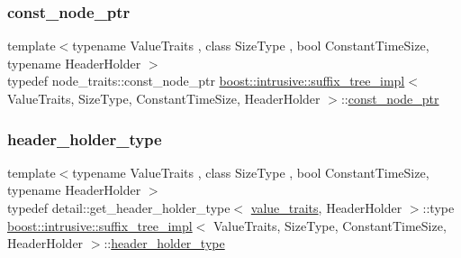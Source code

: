\subsubsection{\texorpdfstring{const\+\_\+node\+\_\+ptr}{const\_node\_ptr}}
{\footnotesize\ttfamily template$<$typename Value\+Traits , class Size\+Type , bool Constant\+Time\+Size, typename Header\+Holder $>$ \\
typedef node\+\_\+traits\+::const\+\_\+node\+\_\+ptr \hyperlink{classboost_1_1intrusive_1_1suffix__tree__impl}{boost\+::intrusive\+::suffix\+\_\+tree\+\_\+impl}$<$ Value\+Traits, Size\+Type, Constant\+Time\+Size, Header\+Holder $>$\+::\hyperlink{classboost_1_1intrusive_1_1suffix__tree__impl_a5cf354495727a0b22948de4115d0a2b8}{const\+\_\+node\+\_\+ptr}}

\mbox{\label{classboost_1_1intrusive_1_1suffix__tree__impl_acb00482132fdd79dc983b313f596e364}} 
\subsubsection{\texorpdfstring{header\+\_\+holder\+\_\+type}{header\_holder\_type}}
{\footnotesize\ttfamily template$<$typename Value\+Traits , class Size\+Type , bool Constant\+Time\+Size, typename Header\+Holder $>$ \\
typedef detail\+::get\+\_\+header\+\_\+holder\+\_\+type$<$ \hyperlink{classboost_1_1intrusive_1_1suffix__tree__impl_a30d9e164c38c11cd38917ad14e9f3e88}{value\+\_\+traits}, Header\+Holder $>$\+::type \hyperlink{classboost_1_1intrusive_1_1suffix__tree__impl}{boost\+::intrusive\+::suffix\+\_\+tree\+\_\+impl}$<$ Value\+Traits, Size\+Type, Constant\+Time\+Size, Header\+Holder $>$\+::\hyperlink{classboost_1_1intrusive_1_1suffix__tree__impl_acb00482132fdd79dc983b313f596e364}{header\+\_\+holder\+\_\+type}}

\mbox{\label{classboost_1_1intrusive_1_1suffix__tree__impl_a2df3b52dced59346b59db470e93ba87c}} 
